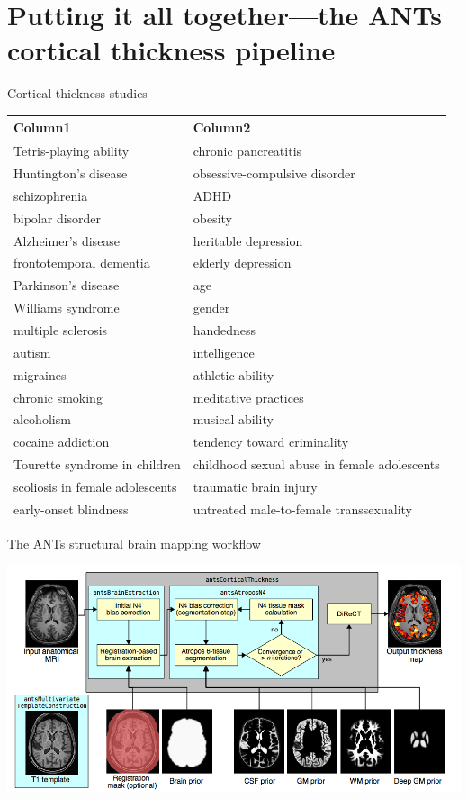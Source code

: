 \documentclass[ignorenonframetext,]{beamer}
\begin{document}
\section{Putting it all together---the ANTs cortical thickness
pipeline}\label{putting-it-all-togetherthe-ants-cortical-thickness-pipeline}

\begin{frame}{Cortical thickness studies}

\begin{longtable}[c]{@{}ll@{}}
\toprule
Column1 & Column2\tabularnewline
\midrule
\endhead
Tetris-playing ability & chronic pancreatitis\tabularnewline
Huntington's disease & obsessive-compulsive disorder\tabularnewline
schizophrenia & ADHD\tabularnewline
bipolar disorder & obesity\tabularnewline
Alzheimer's disease & heritable depression\tabularnewline
frontotemporal dementia & elderly depression\tabularnewline
Parkinson's disease & age\tabularnewline
Williams syndrome & gender\tabularnewline
multiple sclerosis & handedness\tabularnewline
autism & intelligence\tabularnewline
migraines & athletic ability\tabularnewline
chronic smoking & meditative practices\tabularnewline
alcoholism & musical ability\tabularnewline
cocaine addiction & tendency toward criminality\tabularnewline
Tourette syndrome in children & childhood sexual abuse in female
adolescents\tabularnewline
scoliosis in female adolescents & traumatic brain injury\tabularnewline
early-onset blindness & untreated male-to-female
transsexuality\tabularnewline
\bottomrule
\end{longtable}

\end{frame}

\begin{frame}{The ANTs structural brain mapping workflow}

\includegraphics{./evaluation/figures/pipeline.png}

\end{frame}
\end{document}

